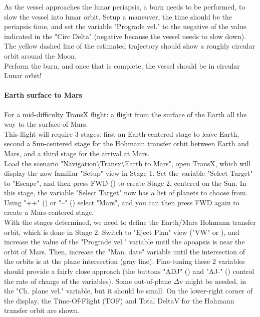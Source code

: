 \documentclass[Orbiter User Manual.tex]{subfiles}
\begin{document}
As the vessel approaches the lunar periapsis, a burn needs to be performed, to slow the vessel into lunar orbit. Setup a maneuver, the time should be the periapsis time, and set the variable "Prograde vel." to the negative of the value indicated in the "Circ Delta" (negative because the vessel needs to slow down). The yellow dashed line of the estimated trajectory should show a roughly circular orbit around the Moon.\\
Perform the burn, and once that is complete, the vessel should be in circular Lunar orbit!\\


\paragraph{Earth surface to Mars}
For a mid-difficulty TransX flight: a flight from the surface of the Earth all the way to the surface of Mars.\\
This flight will require 3 stages: first an Earth-centered stage to leave Earth, second a Sun-centered stage for the Hohmann transfer orbit between Earth and Mars, and a third stage for the arrival at Mars.\\
Load the scenario "Navigation\textbackslash Transx\textbackslash Earth to Mars", open TransX, which will display the now familiar "Setup" view in Stage 1. Set the variable "Select Target" to "Escape", and then press FWD (\Shift{}) to create Stage 2, centered on the Sun. In this stage, the variable "Select Target" now has a list of planets to choose from. Using "++" (\Shift\keystroke{=}) or "--" (\Shift\keystroke{-}) select "Mars", and you can then press FWD again to create a Mars-centered stage.\\
With the stages determined, we need to define the Earth/Mars Hohmann transfer orbit, which is done in Stage 2. Switch to "Eject Plan" view ("VW" or \Shift{}), and increase the value of the "Prograde vel." variable until the apoapsis is near the orbit of Mars. Then, increase the "Man. date" variable until the intersection of the orbits is at the plane intersection (gray line). Fine-tuning these 2 variables should provide a fairly close approach (the buttons "ADJ" (\Shift\keystroke{\{}) and "AJ-" (\Shift\keystroke{\}}) control the rate of change of the variables). Some out-of-plane $\Delta$v might be needed, in the "Ch. plane vel." variable, but it should be small. On the lower-right corner of the display, the Time-Of-Flight (TOF) and Total DeltaV for the Hohmann transfer orbit are shown.\\
\end{document}
